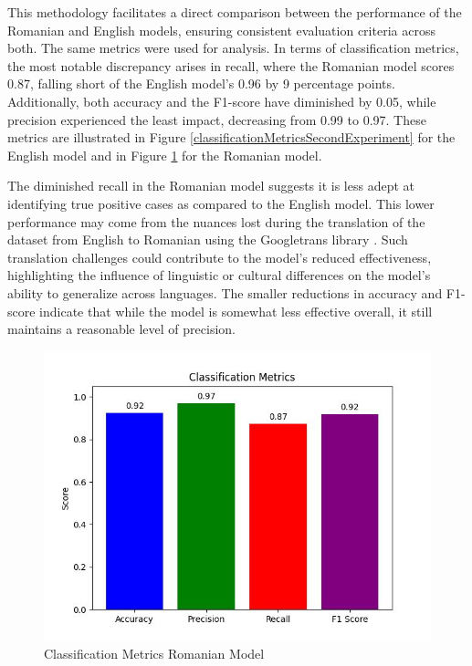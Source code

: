 This methodology facilitates a direct comparison between the performance of the Romanian and English models, ensuring consistent evaluation criteria across both. The same metrics were used for analysis. In terms of classification metrics, the most notable discrepancy arises in recall, where the Romanian model scores 0.87, falling short of the English model's 0.96 by 9 percentage points. Additionally, both accuracy and the F1-score have diminished by 0.05, while precision experienced the least impact, decreasing from 0.99 to 0.97. These metrics are illustrated in Figure \ref{classificationMetricsSecondExperiment} for the English model and in Figure \ref{classificationMetricsRomanianExperiment} for the Romanian model.

The diminished recall in the Romanian model suggests it is less adept at identifying true positive cases as compared to the English model. This lower performance may come from the nuances lost during the translation of the dataset from English to Romanian using the Googletrans library \cite{googletranslib}. Such translation challenges could contribute to the model’s reduced effectiveness, highlighting the influence of linguistic or cultural differences on the model’s ability to generalize across languages. The smaller reductions in accuracy and F1-score indicate that while the model is somewhat less effective overall, it still maintains a reasonable level of precision.

\begin{figure}[htbp]
	\centering
		\includegraphics[scale=0.8]{LaTeX Bachelor Thesis Depression Signs Detection/figures/metrics/experimentRomanian/classificationMetrics.jpg}
	\caption{Classification Metrics Romanian Model}
	\label{classificationMetricsRomanianExperiment}
\end{figure}

